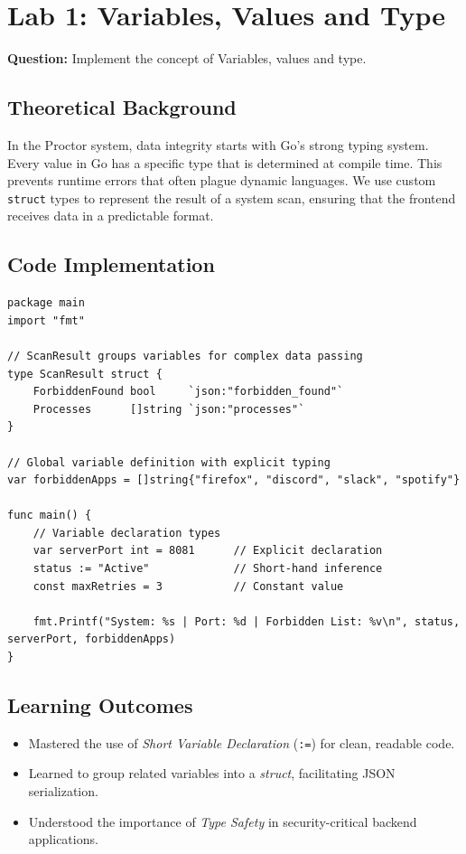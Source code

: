 \documentclass[12pt,a4paper]{article}
\begin{document}

\newpage
\section{Lab 1: Variables, Values and Type}
\textbf{Question:} Implement the concept of Variables, values and type.

\subsection{Theoretical Background}
In the Proctor system, data integrity starts with Go's strong typing system. Every value in Go has a specific type that is determined at compile time. This prevents runtime errors that often plague dynamic languages. We use custom \texttt{struct} types to represent the result of a system scan, ensuring that the frontend receives data in a predictable format.

\subsection{Code Implementation}
\begin{lstlisting}
package main
import "fmt"

// ScanResult groups variables for complex data passing
type ScanResult struct {
	ForbiddenFound bool     `json:"forbidden_found"`
	Processes      []string `json:"processes"`
}

// Global variable definition with explicit typing
var forbiddenApps = []string{"firefox", "discord", "slack", "spotify"}

func main() {
    // Variable declaration types
    var serverPort int = 8081      // Explicit declaration
    status := "Active"             // Short-hand inference
    const maxRetries = 3           // Constant value

    fmt.Printf("System: %s | Port: %d | Forbidden List: %v\n", status, serverPort, forbiddenApps)
}
\end{lstlisting}

\subsection{Learning Outcomes}
\begin{itemize}
    \item Mastered the use of \textit{Short Variable Declaration} (\texttt{:=}) for clean, readable code.
    \item Learned to group related variables into a \textit{struct}, facilitating JSON serialization.
    \item Understood the importance of \textit{Type Safety} in security-critical backend applications.
\end{itemize}
\end{document}
